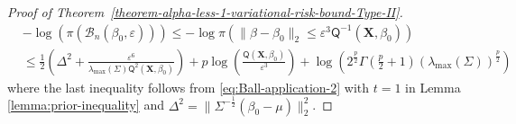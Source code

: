 \documentclass[10pt,a4paper]{amsart}
\begin{document}
\begin{proof}[Proof of Theorem~\ref{theorem-alpha-less-1-variational-risk-bound-Type-II}]
\begin{equation}\label{eq:proof-theorem1-41}
\begin{split}
&-\log (\pi\left(\mathcal{B}_n(\beta_0, \varepsilon)\right))
\leq -\log \pi\left(\lVert\beta - \beta_0\rVert_2 \leq \varepsilon^3\mathsf{Q}^{-1}(\mathbf{X}, \beta_0)\right)\\
&\leq \frac{1}{2}\left(\Delta^2 + \frac{\varepsilon^6}{\lambda_{\mathrm{max}}(\Sigma)\mathsf{Q}^{2}(\mathbf{X}, \beta_0)}\right) + p\log\left(\frac{\mathsf{Q}(\mathbf{X},\beta_0)}{\varepsilon^3}\right) + \log\left(2^{\frac{p}{2}}\Gamma\left(\frac{p}{2}+1\right)(\lambda_{\mathrm{max}}(\Sigma))^{\frac{p}{2}}\right)
\end{split}
\end{equation}
%
where the last inequality follows from \eqref{eq:Ball-application-2} with $t=1$ in Lemma \ref{lemma:prior-inequality} and $\Delta^{2} = \lVert \Sigma^{-\frac{1}{2}}(\beta_0-\mu)\rVert_{2}^{2}$. 


\end{proof}
\end{document}
